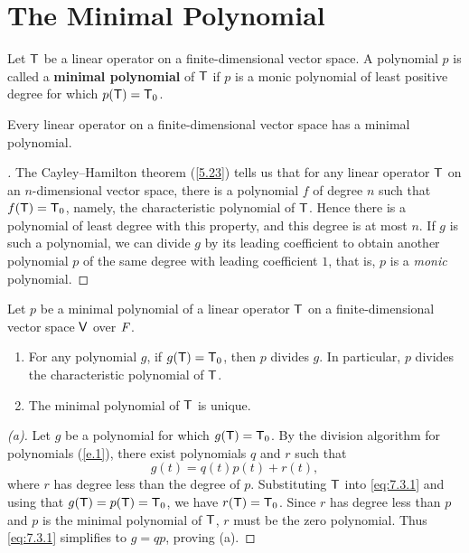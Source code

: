 \section{The Minimal Polynomial}\label{sec:7.3}

\begin{defn}\label{7.3.1}
  Let \(\mathsf{T}\) be a linear operator on a finite-dimensional vector space.
  A polynomial \(p\) is called a \textbf{minimal polynomial} of \(\mathsf{T}\) if \(p\) is a monic polynomial of least positive degree for which \(p(\mathsf{T}) = \mathsf{T}_0\).
\end{defn}

\begin{cor}\label{7.3.2}
  Every linear operator on a finite-dimensional vector space has a minimal polynomial.
\end{cor}

\begin{proof}[]
  The Cayley--Hamilton theorem (\cref{5.23}) tells us that for any linear operator \(\mathsf{T}\) on an \(n\)-dimensional vector space, there is a polynomial \(f\) of degree \(n\) such that \(f(\mathsf{T}) = \mathsf{T}_0\), namely, the characteristic polynomial of \(\mathsf{T}\).
  Hence there is a polynomial of least degree with this property, and this degree is at most \(n\).
  If \(g\) is such a polynomial, we can divide \(g\) by its leading coefficient to obtain another polynomial \(p\) of the same degree with leading coefficient \(1\), that is, \(p\) is a \emph{monic} polynomial.
\end{proof}

\begin{thm}\label{7.12}
  Let \(p\) be a minimal polynomial of a linear operator \(\mathsf{T}\) on a finite-dimensional vector space \(\mathsf{V}\) over \(\mathit{F}\).
  \begin{enumerate}
    \item For any polynomial \(g\), if \(g(\mathsf{T}) = \mathsf{T}_0\), then \(p\) divides \(g\).
          In particular, \(p\) divides the characteristic polynomial of \(\mathsf{T}\).
    \item The minimal polynomial of \(\mathsf{T}\) is unique.
  \end{enumerate}
\end{thm}

\begin{proof}[(a)]
  Let \(g\) be a polynomial for which \(g(\mathsf{T}) = \mathsf{T}_0\).
  By the division algorithm for polynomials (\cref{e.1}), there exist polynomials \(q\) and \(r\) such that
  \begin{equation}\label{eq:7.3.1}
    g(t) = q(t) p(t) + r(t),
  \end{equation}
  where \(r\) has degree less than the degree of \(p\).
  Substituting \(\mathsf{T}\) into \cref{eq:7.3.1} and using that \(g(\mathsf{T}) = p(\mathsf{T}) = \mathsf{T}_0\), we have \(r(\mathsf{T}) = \mathsf{T}_0\).
  Since \(r\) has degree less than \(p\) and \(p\) is the minimal polynomial of \(\mathsf{T}\), \(r\) must be the zero polynomial.
  Thus \cref{eq:7.3.1} simplifies to \(g = qp\), proving (a).
\end{proof}

